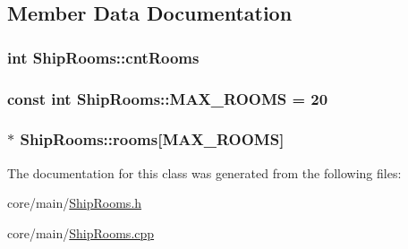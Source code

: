 \subsection{Member Data Documentation}
\hypertarget{classShipRooms_abfd5908b44d8d104c0357035db2a11a0}{
\subsubsection[{cnt\-Rooms}]{\setlength{\rightskip}{0pt plus 5cm}int Ship\-Rooms\-::cnt\-Rooms}}\label{classShipRooms_abfd5908b44d8d104c0357035db2a11a0}
\hypertarget{classShipRooms_a4c6a08678ec28bde999016e8980b7493}{
\subsubsection[{M\-A\-X\-\_\-\-R\-O\-O\-M\-S}]{\setlength{\rightskip}{0pt plus 5cm}const int Ship\-Rooms\-::\-M\-A\-X\-\_\-\-R\-O\-O\-M\-S = 20\hspace{0.3cm}{\ttfamily [static]}}}\label{classShipRooms_a4c6a08678ec28bde999016e8980b7493}
\hypertarget{classShipRooms_a52ced61edb73b269c13ad86c37d58678}{
\subsubsection[{rooms}]{$\ast$ Ship\-Rooms\-::rooms\mbox{[}{\bf M\-A\-X\-\_\-\-R\-O\-O\-M\-S}\mbox{]}}}\label{classShipRooms_a52ced61edb73b269c13ad86c37d58678}


The documentation for this class was generated from the following files\-:\begin{DoxyCompactItemize}
\item 
core/main/\hyperlink{ShipRooms_8h}{Ship\-Rooms.\-h}\item 
core/main/\hyperlink{ShipRooms_8cpp}{Ship\-Rooms.\-cpp}\end{DoxyCompactItemize}
